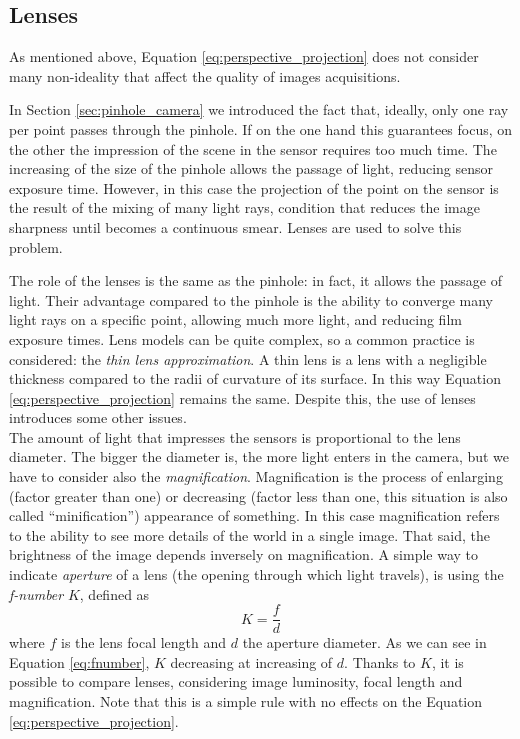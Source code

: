 \subsection{Lenses}
\label{subsec:lenses}
As mentioned above, Equation \ref{eq:perspective_projection} does not consider many non-ideality that affect the quality of images acquisitions. 

In Section \ref{sec:pinhole_camera} we introduced the fact that, ideally, only one ray per point passes through the pinhole. If on the one hand this guarantees focus, on the other the impression of the scene in the sensor requires too much time. The increasing of the size of the pinhole allows the passage of light, reducing sensor exposure time. However, in this case the projection of the point on the sensor is the result of the mixing of many light rays, condition that reduces the image sharpness until becomes a continuous smear. Lenses are used to solve this problem.

The role of the lenses is the same as the pinhole: in fact, it allows the passage of light. Their advantage compared to the pinhole is the ability to converge many light rays on a specific point, allowing much more light, and reducing film exposure times. Lens models can be quite complex, so a common practice is considered: the \textit{thin lens approximation}. A thin lens is a lens with a negligible thickness compared to the radii of curvature of its surface. In this way Equation \ref{eq:perspective_projection} remains the same. Despite this, the use of lenses introduces some other issues. \\

The amount of light that impresses the sensors is proportional to the lens diameter. The bigger the diameter is, the more light enters in the camera, but we have to consider also the \textit{magnification}. Magnification is the process of enlarging (factor greater than one) or decreasing (factor less than one, this situation is also called ``minification'') appearance of something. In this case magnification refers to the ability to see more details of the world in a single image. That said, the brightness of the image depends inversely on magnification. A simple way to indicate \textit{aperture} of a lens (the opening through which light travels), is using the \textit{f-number} $K$, defined as
  \begin{equation}
    K = \frac{f}{d}
    \label{eq:fnumber}
  \end{equation}
where $f$ is the lens focal length and $d$ the aperture diameter. As we can see in Equation \ref{eq:fnumber}, $K$ decreasing at increasing of $d$. Thanks to $K$, it is possible to compare lenses, considering image luminosity, focal length and magnification. Note that this is a simple rule with no effects on the Equation \ref{eq:perspective_projection}. \\
  
